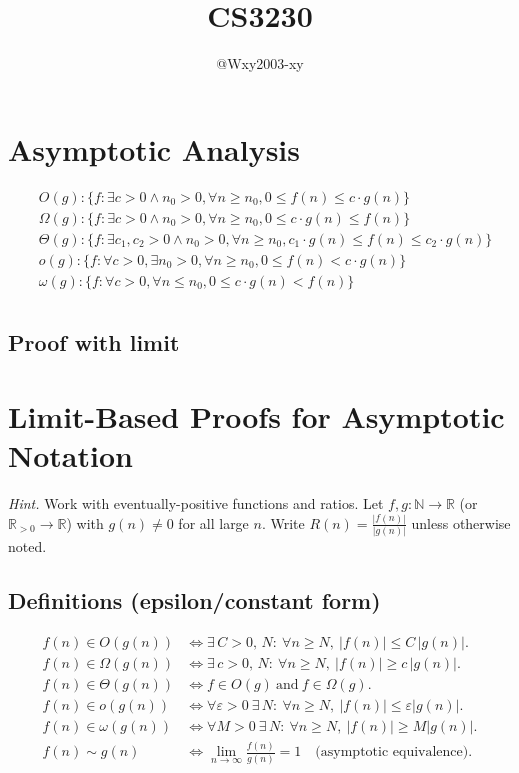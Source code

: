 \documentclass[9pt]{extarticle}
\begin{document}
\title{CS3230}
\author{@Wxy2003-xy}
\date{}
\maketitle

\newpage
\tableofcontents
\newpage

\section{Asymptotic Analysis}
\begin{align*}
    &O(g): \{f: \exists c > 0 \land n_0 > 0, \forall n \geq n_0, 0 \leq f(n) \leq c \cdot g(n)\} \\
    &\Omega(g): \{f: \exists c > 0 \land n_0 > 0, \forall n \geq n_0, 0 \leq c \cdot g(n) \leq f(n)\} \\
    &\Theta(g): \{f: \exists c_1, c_2 > 0 \land n_0 > 0, \forall n \geq n_0, c_1 \cdot g(n) \leq f(n) \leq c_2 \cdot g(n)\} \\
    &o(g): \{f: \forall c > 0, \exists n_0 > 0, \forall n \geq n_0, 0 \leq f(n) < c \cdot g(n)\} \\ 
    &\omega(g): \{f: \forall c > 0, \forall n \leq n_0, 0 \leq c \cdot g(n) < f(n)\} \\
\end{align*}
\subsection{Proof with limit}

\section*{Limit-Based Proofs for Asymptotic Notation}
\textit{Hint.} Work with eventually-positive functions and ratios. Let $f,g:\mathbb{N}\to\mathbb{R}$ (or $\mathbb{R}_{>0}\to\mathbb{R}$) with $g(n)\neq 0$ for all large $n$. Write $R(n)=\frac{|f(n)|}{|g(n)|}$ unless otherwise noted.

\subsection*{Definitions (epsilon/constant form)}
\begin{align*}
f(n)\in O(g(n)) &\iff \exists\,C>0,\,N:\ \forall n\ge N,\ |f(n)|\le C\,|g(n)|.\\
f(n)\in \Omega(g(n)) &\iff \exists\,c>0,\,N:\ \forall n\ge N,\ |f(n)|\ge c\,|g(n)|.\\
f(n)\in \Theta(g(n)) &\iff f\in O(g)\ \text{and}\ f\in \Omega(g).\\
f(n)\in o(g(n)) &\iff \forall \varepsilon>0\ \exists\,N:\ \forall n\ge N,\ |f(n)|\le \varepsilon |g(n)|.\\
f(n)\in \omega(g(n)) &\iff \forall M>0\ \exists\,N:\ \forall n\ge N,\ |f(n)|\ge M |g(n)|.\\
f(n)\sim g(n) &\iff \lim_{n\to\infty}\frac{f(n)}{g(n)}=1\quad\text{(asymptotic equivalence).}
\end{align*}
\end{document}
